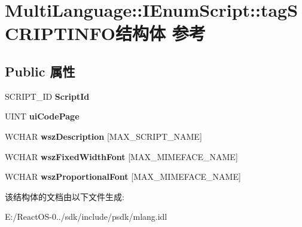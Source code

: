 \hypertarget{struct_multi_language_1_1_i_enum_script_1_1tag_s_c_r_i_p_t_i_n_f_o}{}\section{Multi\+Language\+:\+:I\+Enum\+Script\+:\+:tag\+S\+C\+R\+I\+P\+T\+I\+N\+F\+O结构体 参考}
\label{struct_multi_language_1_1_i_enum_script_1_1tag_s_c_r_i_p_t_i_n_f_o}
\subsection*{Public 属性}
\begin{DoxyCompactItemize}
\item 
\mbox{\label{struct_multi_language_1_1_i_enum_script_1_1tag_s_c_r_i_p_t_i_n_f_o_a86611b957a9e37d23552e87201a684a5}} 
S\+C\+R\+I\+P\+T\+\_\+\+ID {\bfseries Script\+Id}
\item 
\mbox{\label{struct_multi_language_1_1_i_enum_script_1_1tag_s_c_r_i_p_t_i_n_f_o_a863e1d6e6ff373385f363fd91f046871}} 
U\+I\+NT {\bfseries ui\+Code\+Page}
\item 
\mbox{\label{struct_multi_language_1_1_i_enum_script_1_1tag_s_c_r_i_p_t_i_n_f_o_ab565d2965876c955602a7f304f64e93d}} 
W\+C\+H\+AR {\bfseries wsz\+Description} \mbox{[}M\+A\+X\+\_\+\+S\+C\+R\+I\+P\+T\+\_\+\+N\+A\+ME\mbox{]}
\item 
\mbox{\label{struct_multi_language_1_1_i_enum_script_1_1tag_s_c_r_i_p_t_i_n_f_o_af622dfbee517124fe47f93666c5647c1}} 
W\+C\+H\+AR {\bfseries wsz\+Fixed\+Width\+Font} \mbox{[}M\+A\+X\+\_\+\+M\+I\+M\+E\+F\+A\+C\+E\+\_\+\+N\+A\+ME\mbox{]}
\item 
\mbox{\label{struct_multi_language_1_1_i_enum_script_1_1tag_s_c_r_i_p_t_i_n_f_o_a3470626b8d5afdb4073ee395d614c4e8}} 
W\+C\+H\+AR {\bfseries wsz\+Proportional\+Font} \mbox{[}M\+A\+X\+\_\+\+M\+I\+M\+E\+F\+A\+C\+E\+\_\+\+N\+A\+ME\mbox{]}
\end{DoxyCompactItemize}


该结构体的文档由以下文件生成\+:\begin{DoxyCompactItemize}
\item 
E\+:/\+React\+O\+S-\/0../sdk/include/psdk/mlang.\+idl\end{DoxyCompactItemize}

